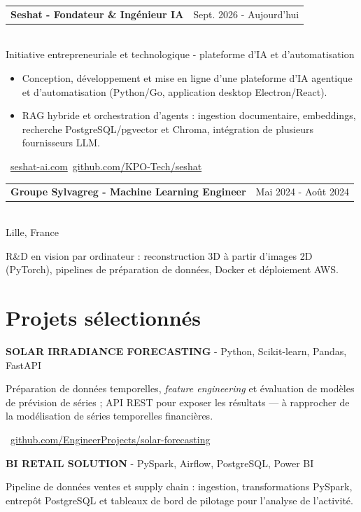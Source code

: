 \documentclass[10pt,a4paper]{article}
\makeatletter
\newcommand{\role}[3]{%
  \vspace{3pt}
  \begin{tabularx}{\linewidth}{@{}Xr@{}}
  \textbf{#1} & {\color{muted}#2}
  \end{tabularx}\vspace{0.8pt}\\
  {\color{muted}#3}\par
  \vspace{3pt}
}
\newcommand{\projectline}[2]{%
  \textbf{#1} - #2\par
}
\newcommand{\githublink}[2]{%
  \par{\footnotesize\color{accent}\faIcon{github}\ \href{#1}{#2}}\par
}
\newlength{\maincolumnheight}
\makeatother
\begin{document}
\begin{lrbox}{\maincolumnbox}
\begin{minipage}[t]{0.695\textwidth}
\vspace{8pt}
\role{Seshat - Fondateur \& Ingénieur IA}{Sept. 2026 - Aujourd'hui}{Initiative entrepreneuriale et technologique - plateforme d'IA et d'automatisation}
\begin{itemize}
  \item Conception, développement et mise en ligne d'une plateforme d'IA agentique et d'automatisation (Python/Go, application desktop Electron/React).
  \item RAG hybride et orchestration d'agents : ingestion documentaire, embeddings, recherche PostgreSQL/pgvector et Chroma, intégration de plusieurs fournisseurs LLM.
\end{itemize}
{\footnotesize\color{accent}\ \href{https://seshat-ai.com}{seshat-ai.com}\enspace\textbullet\enspace{}\ \href{https://github.com/KPO-Tech/seshat}{github.com/KPO-Tech/seshat}}\par

\vspace{8pt}
\role{Groupe Sylvagreg - Machine Learning Engineer}{Mai 2024 - Août 2024}{Lille, France}
R\&D en vision par ordinateur : reconstruction 3D à partir d'images 2D (PyTorch), pipelines de préparation de données, Docker et déploiement AWS.\par

\section{Projets sélectionnés}
\projectline{SOLAR IRRADIANCE FORECASTING}{Python, Scikit-learn, Pandas, FastAPI}
Préparation de données temporelles, \emph{feature engineering} et évaluation de modèles de prévision de séries ; API REST pour exposer les résultats — \`a rapprocher de la modélisation de séries temporelles financières.
\githublink{https://github.com/EngineerProjects/solar-forecasting}{github.com/EngineerProjects/solar-forecasting}

\vspace{9pt}
\projectline{BI RETAIL SOLUTION}{PySpark, Airflow, PostgreSQL, Power BI}
Pipeline de données ventes et supply chain : ingestion, transformations PySpark, entrepôt PostgreSQL et tableaux de bord de pilotage pour l'analyse de l'activité.

\end{minipage}
\end{lrbox}
\setlength{\maincolumnheight}{\dimexpr\ht\maincolumnbox+\dp\maincolumnbox\relax}
\end{document}
